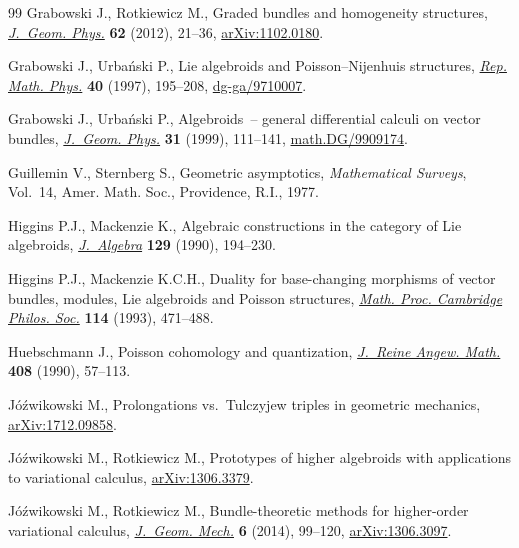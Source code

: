 \begin{thebibliography}{99}
Grabowski J., Rotkiewicz M., Graded bundles and homogeneity structures,
 \href{https://doi.org/10.1016/j.geomphys.2011.09.004}{\textit{J.~Geom. Phys.}} \textbf{62} (2012), 21--36, \href{https://arxiv.org/abs/1102.0180}{arXiv:1102.0180}.

Grabowski J., Urba\'{n}ski P., Lie algebroids and {P}oisson--{N}ijenhuis
 structures, \href{https://doi.org/10.1016/S0034-4877(97)85916-2}{\textit{Rep. Math. Phys.}} \textbf{40} (1997), 195--208,
 \href{https://arxiv.org/abs/dg-ga/9710007}{dg-ga/9710007}.

Grabowski J., Urba\'{n}ski P., Algebroids~-- general differential calculi on
 vector bundles, \href{https://doi.org/10.1016/S0393-0440(99)00007-8}{\textit{J.~Geom. Phys.}} \textbf{31} (1999), 111--141,
 \href{https://arxiv.org/abs/math.DG/9909174}{math.DG/9909174}.

Guillemin V., Sternberg S., Geometric asymptotics, \textit{Mathematical
 Surveys}, Vol.~14, Amer. Math. Soc., Providence, R.I., 1977.

Higgins P.J., Mackenzie K., Algebraic constructions in the category of {L}ie
 algebroids, \href{https://doi.org/10.1016/0021-8693(90)90246-K}{\textit{J.~Algebra}} \textbf{129} (1990), 194--230.

Higgins P.J., Mackenzie K.C.H., Duality for base-changing morphisms of vector
 bundles, modules, {L}ie algebroids and {P}oisson structures, \href{https://doi.org/10.1017/S0305004100071760}{\textit{Math.
 Proc. Cambridge Philos. Soc.}} \textbf{114} (1993), 471--488.

Huebschmann J., Poisson cohomology and quantization, \href{https://doi.org/10.1515/crll.1990.408.57}{\textit{J.~Reine Angew.
 Math.}} \textbf{408} (1990), 57--113.

J\'{o}\'{z}wikowski M., Prolongations vs.~{T}ulczyjew triples in geometric
 mechanics, \href{https://arxiv.org/abs/1712.09858}{arXiv:1712.09858}.

J\'{o}\'{z}wikowski M., Rotkiewicz M., Prototypes of higher algebroids with
 applications to variational calculus, \href{https://arxiv.org/abs/1306.3379}{arXiv:1306.3379}.

J\'{o}\'{z}wikowski M., Rotkiewicz M., Bundle-theoretic methods for
 higher-order variational calculus, \href{https://doi.org/10.3934/jgm.2014.6.99}{\textit{J.~Geom. Mech.}} \textbf{6} (2014),
 99--120, \href{https://arxiv.org/abs/1306.3097}{arXiv:1306.3097}.


\end{thebibliography}
